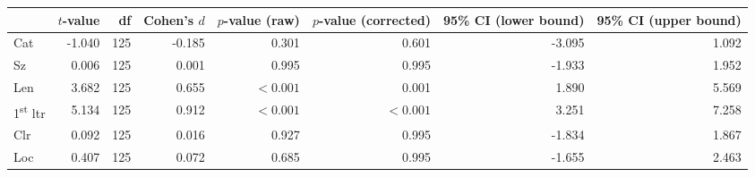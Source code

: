 \begin{tabular}{lrrrrrrr}
\toprule
{} & $t$-value &  df & Cohen's $d$ & $p$-value (raw) & $p$-value (corrected) & 95\% CI (lower bound) & 95\% CI (upper bound) \\
\midrule
Cat                       &    -1.040 & 125 &      -0.185 &           0.301 &                 0.601 &                -3.095 &                 1.092 \\
Sz                        &     0.006 & 125 &       0.001 &           0.995 &                 0.995 &                -1.933 &                 1.952 \\
Len                       &     3.682 & 125 &       0.655 &       $< 0.001$ &                 0.001 &                 1.890 &                 5.569 \\
1\textsuperscript{st} ltr &     5.134 & 125 &       0.912 &       $< 0.001$ &             $< 0.001$ &                 3.251 &                 7.258 \\
Clr                       &     0.092 & 125 &       0.016 &           0.927 &                 0.995 &                -1.834 &                 1.867 \\
Loc                       &     0.407 & 125 &       0.072 &           0.685 &                 0.995 &                -1.655 &                 2.463 \\
\bottomrule
\end{tabular}
